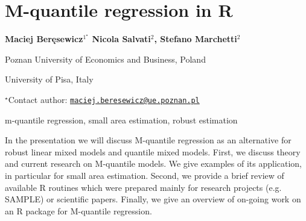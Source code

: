 \documentclass[\main/boa.tex]{subfiles}
\begin{document}
\section{M-quantile regression in R}

\begin{center}
  {\bf 
   Maciej Beręsewicz$^{1^\star}$
   Nicola Salvati$^{2}$, 
   Stefano Marchetti$^{2}$}
\end{center}

\vskip 0.3cm

\begin{affiliations}
\begin{enumerate}
\begin{minipage}{0.915\textwidth}
\centering
\item Poznan University of Economics and Business, Poland \\[-2pt]
\item University of Pisa, Italy
\end{minipage}
\end{enumerate}
$^\star$Contact author: \href{mailto:maciej.beresewicz@ue.poznan.pl}{\nolinkurl{maciej.beresewicz@ue.poznan.pl}}\\
\end{affiliations}

\vskip 0.5cm

\begin{minipage}{0.915\textwidth}
\keywords m-quantile regression, small area estimation, robust estimation
\end{minipage}

\vskip 0.8cm

In the presentation we will discuss M-quantile regression as an alternative for robust linear mixed models and quantile mixed models. First, we discuss theory and current research on M-quantile models. We give examples of its application, in particular for small area estimation. Second, we provide a brief review of available R routines which were prepared mainly for research projects (e.g. SAMPLE) or scientific papers. Finally, we give an overview of on-going work on an R package for M-quantile regression.
\end{document}
